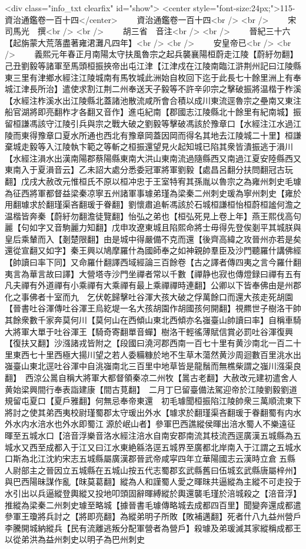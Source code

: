 <div class="info_txt clearfix" id="show">
<center style="font-size:24px;">115-資治通鑑卷一百十四</center>
  　　資治通鑑卷一百十四<br />
<br />
　　宋　司馬光　撰<br />
<br />
　　胡三省　音注<br />
<br />
　　晉紀三十六【起旃蒙大荒落盡著雍涒灘凡四年】<br />
<br />
　　安皇帝已<br />
<br />
　　義熙元年春正月南陽太守扶風魯宗之起兵襲襄陽桓蔚走江陵【蔚紆勿翻】己丑劉毅等諸軍至馬頭桓振挾帝出屯江津【江津戍在江陵南臨江滸荆州記曰江陵縣東三里有津鄉水經注江陵城南有馬牧城此洲始自枚回下迄于此長七十餘里洲上有奉城江津長所治】遣使求割江荆二州奉送天子毅等不許辛卯宗之擊破振將温楷于柞溪【水經注柞溪水出江陵縣北蓋諸池散流咸所會合積以成川東流逕魯宗之壘南又東注船官湖將即亮翻柞才各翻又音作】進屯紀南【郡國志江陵縣北十餘里有紀南城】振留桓謙馮該守江陵引兵與宗之戰大破之劉毅等擊破馮該於豫章口【水經注江水過江陵而東得豫章口夏水所通也西北有豫章岡蓋因岡而得名其地去江陵城二十里】桓謙棄城走毅等入江陵執卞範之等斬之桓振還望見火起知城已陷其衆皆潰振逃于溳川【水經注溳水出漢南陽郡蔡陽縣東南大洪山東南流過隨縣西又南過江夏安陸縣西又東南入于夏溳音云】乙未詔大處分悉委冠軍將軍劉毅【處昌呂翻分扶問翻冠古玩翻】戊戌大赦改元惟桓氏不原以桓冲忠于王室特宥其孫胤以魯宗之為雍州刺史毛璩為征西將軍都督益梁秦凉寧五州諸軍事璩弟瑾為梁秦二州刺史瑗為寧州刺史【雍於用翻璩求於翻瑾渠吝翻瑗于眷翻】劉懷肅追斬馮該於石城桓謙桓怡桓蔚桓謐何澹之温楷皆奔秦【蔚紆勿翻澹徒覽翻】怡弘之弟也【桓弘死見上卷上年】燕王熙伐高句麗【句如字又音駒麗力知翻】戊申攻遼東城且陷熙命將士毋得先登俟剗平其城朕與皇后乘輦而入【剗楚限翻】由是城中得嚴備不克而還【後齊高緯之攻晉州亦若是矣還從宣翻又如字】秦王興以鳩摩羅什為國師奉之如神親帥羣臣及沙門聽羅什講佛經【帥讀曰率下同】又命羅什翻譯西域經論三百餘卷【古之譯者傳四夷之言今羅什翻夷言為華言故曰譯】大營塔寺沙門坐禪者常以千數【禪静也寂也傳燈録曰禪有五有凡夫禪有外道禪有小乘禪有大乘禪有最上乘禪禪時連翻】公卿以下皆奉佛由是州郡化之事佛者十室而九　乞伏乾歸擊吐谷渾大孩大破之俘萬餘口而還大孩走死胡園【晉書吐谷渾傳吐谷渾王烏紇堤一名大孩胡園作胡國孩何開翻】視羆世子樹洛干帥其餘衆數千家奔莫何川【莫何山在西傾山東北西傾亦名嵹臺山帥讀曰率】自稱車騎大將軍大單于吐谷渾王【騎奇寄翻單音蟬】樹洛干輕徭薄賦信賞必罰吐谷渾復興【復扶又翻】沙漒諸戎皆附之【段國曰澆河郡西南一百七十里有黄沙南北一百二十里東西七十里西極大揚川望之若人委糒糠於地不生草木蕩然黄沙周迴數百里洮水出嵹臺山東北逕吐谷渾中自洮嵹南北三百里中地草皆是龍鬚而無樵柴謂之嵹川漒渠良翻】　西涼公暠自稱大將軍大都督領秦凉二州牧【暠古老翻】大赦改元建初遣舍人黄始梁興間行奉表詣建康【間古莧翻】　二月丁巳留臺備法駕迎帝於江陵劉毅劉道規留屯夏口【夏戶雅翻】何無忌奉帝東還　初毛璩聞桓振陷江陵帥衆三萬順流東下將討之使其弟西夷校尉瑾蜀郡太守瑗出外水【璩求於翻瑾渠吝翻瑗于眷翻蜀有内水外水内水涪水也外水即蜀江源於岷山者】參軍巴西譙縱侯暉出涪水蜀人不樂遠征暉至五城水口【涪音浮樂音洛水經注涪水自南安郡南流其枝流西逕廣漢五城縣為五城水又西至成都入于江又曰江水東絶緜洛逕五城界至廣都北岸南入于江謂之五城水口斯為北江沈約宋志五城縣屬廣漢郡晉武帝咸寜四年立華陽國志云漢時立倉五縣人尉部主之晉因立五城縣在五城山按五代志蜀郡玄武縣舊曰伍城玄武縣唐屬梓州】與巴西陽昧謀作亂【昩莫葛翻】縱為人和謹蜀人愛之暉昩共逼縱為主縱不可走投于水引出以兵逼縱登輿縱又投地叩頭固辭暉縛縱於輿還襲毛瑾於涪城殺之【涪音浮】推縱為梁秦二州刺史璩至略城【據晉書毛璩傳略城去成都四百里】聞變奔還成都遣參軍王瓊將兵討之【將即亮翻】為縱弟明子所敗【敗補邁翻】死者什八九益州營戶李騰開城納縱兵【民有流離逃叛分配軍營者為營戶】殺璩及弟瑗滅其家縱稱成都王以從弟洪為益州刺史以明子為巴州刺史